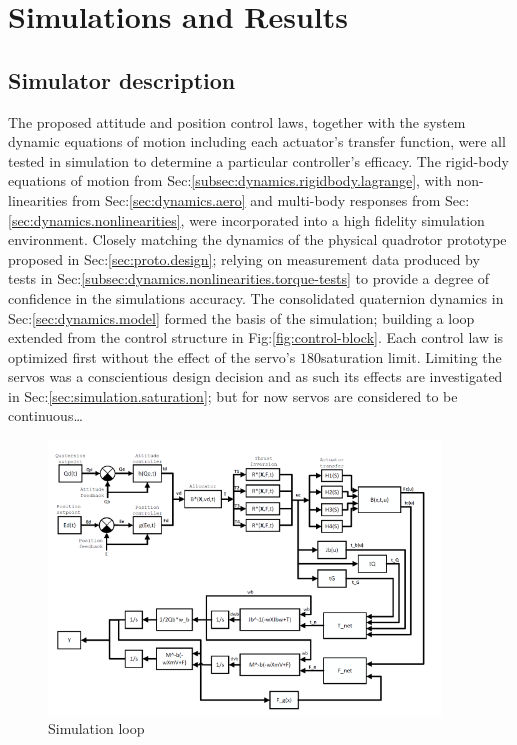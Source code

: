 \chapter{Simulations and Results}
\label{ch:simulation}
\section{Simulator description}
\label{sec:simulation.block}
The proposed attitude and position control laws, together with the system dynamic equations of motion including each actuator's transfer function, were all tested in simulation to determine a particular controller's efficacy. The rigid-body equations of motion from Sec:\ref{subsec:dynamics.rigidbody.lagrange}, with non-linearities from Sec:\ref{sec:dynamics.aero} and multi-body responses from Sec:\ref{sec:dynamics.nonlinearities}, were incorporated into a high fidelity simulation environment. Closely matching the dynamics of the physical quadrotor prototype proposed in Sec:\ref{sec:proto.design}; relying on measurement data produced by tests in Sec:\ref{subsec:dynamics.nonlinearities.torque-tests} to provide a degree of confidence in the simulations accuracy. The consolidated quaternion dynamics in Sec:\ref{sec:dynamics.model} formed the basis of the simulation; building a loop extended from the control structure in Fig:\ref{fig:control-block}. Each control law is optimized first without the effect of the servo's $180$\textdegree saturation limit. Limiting the servos was a conscientious design decision and as such its effects are investigated in Sec:\ref{sec:simulation.saturation}; but for now servos are considered to be continuous\ldots
\par
\begin{figure}[htbp]
\vspace{-12pt}
\centering
\includegraphics[width=0.93\textwidth]{figs/simulation-block}
\caption{Simulation loop}
\label{fig:simulation-block}
\end{figure}
